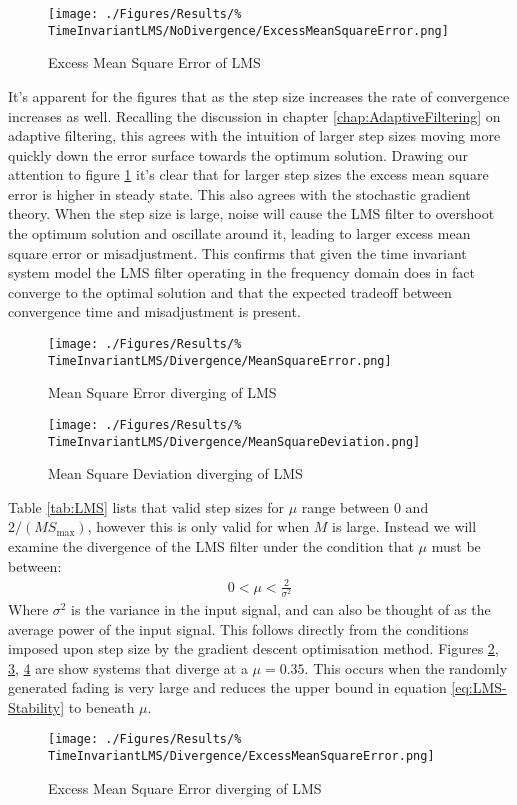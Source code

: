 \begin{figure}[ht]
	\texttt{[image: ./Figures/Results/\%
	TimeInvariantLMS/NoDivergence/ExcessMeanSquareError.png]}
	\caption{Excess Mean Square Error of LMS}
	\label{fig:LMS-EMSE}
\end{figure}
It's apparent for the figures that as the step size increases the %
rate of convergence increases as well. Recalling the discussion in %
chapter \ref{chap:AdaptiveFiltering} on adaptive filtering, this agrees %
with the intuition of larger step sizes moving more quickly down the error %
surface towards the optimum solution. Drawing our attention to figure %
\ref{fig:LMS-EMSE} it's clear that for larger step sizes the excess %
mean square error is higher in steady state. This also agrees with the %
stochastic gradient theory. When the step size is large, noise will cause %
the LMS filter to overshoot the optimum solution and oscillate around it, %
leading to larger excess mean square error or misadjustment. This confirms %
that given the time invariant system model the LMS filter operating in the %
frequency domain does in fact converge to the optimal solution and that %
the expected tradeoff between convergence time and misadjustment is %
present.
\begin{figure}[ht]
	\texttt{[image: ./Figures/Results/\%
	TimeInvariantLMS/Divergence/MeanSquareError.png]}
	\caption{Mean Square Error diverging of LMS}
	\label{fig:LMS-MSE-Diverge}
\end{figure}
\begin{figure}[ht]
	\texttt{[image: ./Figures/Results/\%
	TimeInvariantLMS/Divergence/MeanSquareDeviation.png]}
	\caption{Mean Square Deviation diverging of LMS}
	\label{fig:LMS-MSD-Diverge}
\end{figure}
Table \ref{tab:LMS} lists that valid step sizes for $\mu$ range between %
$0$ and $2/(M S_{\text{max}})$, however this is only valid for when %
$M$ is large. Instead we will examine the divergence of the LMS filter %
under the condition that $\mu$ must be between:
\begin{align}
	0 < \mu < \frac{2}{\sigma^{2}}
	\label{eq:LMS-Stability}
\end{align}
Where $\sigma^{2}$ is the variance in the input signal, and can also %
be thought of as the average power of the input signal. This follows %
directly from the conditions imposed upon step size by the gradient %
descent optimisation method. Figures \ref{fig:LMS-MSE-Diverge}, %
\ref{fig:LMS-MSD-Diverge}, \ref{fig:LMS-EMSE-Diverge} are %
show systems that diverge at a $\mu = 0.35$. This occurs %
when the randomly generated fading is very large and reduces %
the upper bound in equation \ref{eq:LMS-Stability} to beneath %
$\mu$.
\begin{figure}[ht]
	\texttt{[image: ./Figures/Results/\%
	TimeInvariantLMS/Divergence/ExcessMeanSquareError.png]}
	\caption{Excess Mean Square Error diverging of LMS}
	\label{fig:LMS-EMSE-Diverge}
\end{figure}
\FloatBarrier
